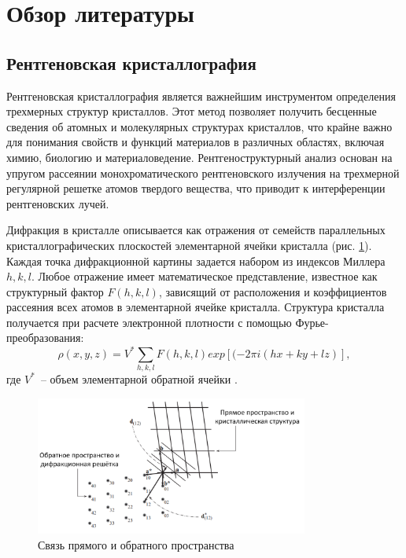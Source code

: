 \section{Обзор литературы}

\subsection{Рентгеновская кристаллография}


Рентгеновская кристаллография является важнейшим инструментом определения трехмерных структур кристаллов. Этот метод позволяет получить бесценные сведения об атомных и молекулярных структурах кристаллов, что крайне важно для понимания свойств и функций материалов в различных областях, включая химию, биологию и материаловедение. Рентгеноструктурный анализ основан на упругом рассеянии монохроматического рентгеновского излучения на трехмерной регулярной решетке атомов твердого вещества, что приводит к интерференции рентгеновских лучей.

Дифракция в кристалле описывается как отражения от семейств параллельных кристаллографических плоскостей элементарной ячейки кристалла (рис. \ref{hkl}). Каждая точка дифракционной картины задается набором из индексов Миллера $h,k,l$. Любое отражение имеет математическое представление, известное как структурный фактор $F(h,k,l)$, зависящий от расположения и коэффициентов рассеяния всех
атомов в элементарной ячейке кристалла. Структура кристалла получается при расчете электронной плотности с помощью Фурье-преобразования: \[\rho(x, y, z) = V^*\sum_{h,k,l} F(h,k,l) exp[(-2\pi i (hx+ky+lz)],\] где $V^*$~-- объем элементарной обратной ячейки \cite{girolami_x-ray_2016}. 

\begin{figure}[H]
	\centering
	\includegraphics[width=0.8\textwidth]{figures/direct_reciprocal.png}\hfill
	\caption{Связь прямого и обратного пространства \cite{girolami_x-ray_2016}}
	\label{hkl}
\end{figure}




